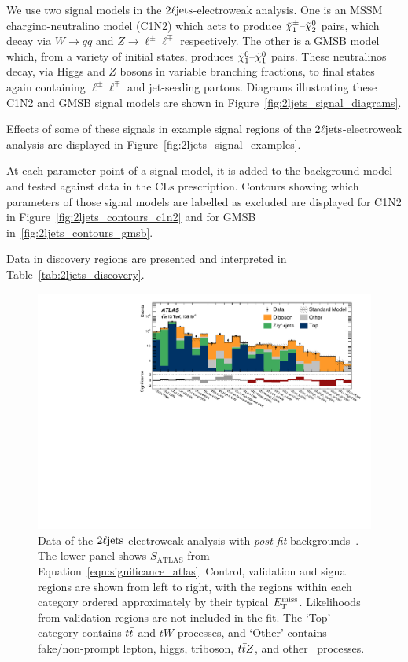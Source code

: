 We use two signal models in the $\twoljets$-electroweak analysis.
One is an MSSM chargino-neutralino model (C1N2) which acts to produce
$\tilde\chi^\pm_1\textrm{--}\tilde\chi^0_2$ pairs, which decay via
$W\rightarrow q\bar q$ and
$Z\rightarrow \ell^\pm \ell^\mp$ respectively.
The other is a GMSB model which, from a variety of initial states, produces
$\tilde\chi^0_1\textrm{--}\tilde\chi^0_1$ pairs.
These neutralinos decay,
via Higgs and $Z$ bosons in variable branching fractions,
to final states again containing $\ell^\pm \ell^\mp$ and jet-seeding partons.
Diagrams illustrating these C1N2 and GMSB signal models are shown in
Figure~\ref{fig:2ljets_signal_diagrams}.

Effects of some of these signals in example signal regions of the
$\twoljets$-electroweak analysis are displayed in
Figure~\ref{fig:2ljets_signal_examples}.

At each parameter point of a signal model, it is added to the background model
and tested against data in the $\mathrm{CLs}$ prescription.
Contours showing which parameters of those signal models are labelled as
excluded are displayed for
C1N2 in Figure~\ref{fig:2ljets_contours_c1n2} and for
GMSB in~\ref{fig:2ljets_contours_gmsb}.

Data in discovery regions are presented and interpreted in
Table~\ref{tab:2ljets_discovery}.

\begin{figure}[tp]
\centering
\includegraphics[width=\textwidth]{figures/2ljets_summary_log.pdf}
\caption[
Data of the $\twoljets$-electroweak analysis with \emph{post-fit}
backgrounds
]{%
Data of the $\twoljets$-electroweak analysis with \emph{post-fit}
backgrounds~\cite{atlas2022searches}.
The lower panel shows $S_\mathrm{ATLAS}$ from
Equation~\ref{eqn:significance_atlas}.
Control, validation and signal regions are shown from left to right, with the
regions within each category ordered approximately by their typical $E_\mathrm{T}^\mathrm{miss}$.
Likelihoods from validation regions are not included in the fit.
The `Top' category contains $t\bar t$ and $tW$ processes, and
`Other' contains fake/non-prompt lepton, higgs, triboson, $t\bar t Z$, and other
\topother\ processes.%
}
\label{fig:2ljets_summary}
\end{figure}

